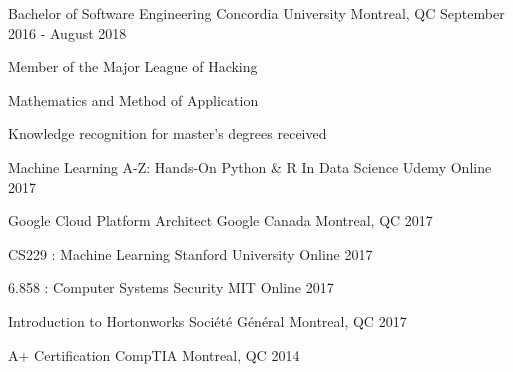 

\begin{cventries}

  \cventry
    {Bachelor of Software Engineering}
    {Concordia University}
    {Montreal, QC}
    {September 2016 - August 2018}
    {
      \begin{cvitems}
        \item {Member of the Major League of Hacking}
        \item {Mathematics and Method of Application}
        \item {Knowledge recognition for master's degrees received}
      \end{cvitems}
    }

\end{cventries}

\begin{cvhonors}

  \cvhonor
    {Machine Learning A-Z: Hands-On Python \& R In Data Science}
    {Udemy}
    {Online}
    {2017}
    
  \cvhonor
    {Google Cloud Platform Architect}
    {Google Canada}
    {Montreal, QC}
    {2017}

  \cvhonor
    {CS229 : Machine Learning}
    {Stanford University}
    {Online}
    {2017}

  \cvhonor
    {6.858 : Computer Systems Security}
    {MIT}
    {Online}
    {2017}

  \cvhonor
    {Introduction to Hortonworks}
    {Société Général}
    {Montreal, QC}
    {2017}
	
  \cvhonor
    {A+ Certification}
    {CompTIA}
    {Montreal, QC}
    {2014}

\end{cvhonors}